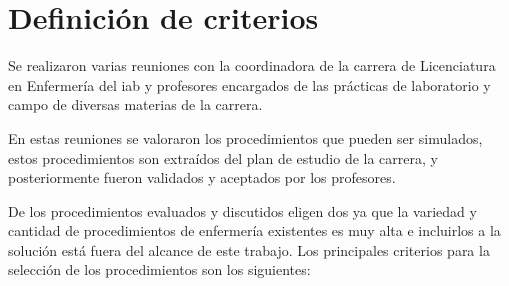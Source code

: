 \section{Definición de criterios}
\label{sec:criterios}

Se realizaron varias reuniones con la coordinadora de la carrera de Licenciatura
en Enfermería del \Gls{iab} y profesores encargados de las prácticas de
laboratorio y campo de diversas materias de la carrera.

En estas reuniones se valoraron los procedimientos que pueden ser simulados,
estos procedimientos son extraídos del plan de estudio de la carrera, y 
posteriormente fueron validados y aceptados por los profesores.

De los procedimientos evaluados y discutidos eligen dos ya que la variedad y 
cantidad de procedimientos de enfermería existentes es muy alta e incluirlos 
a la solución está fuera del alcance de este trabajo. Los principales criterios 
para la selección de los procedimientos son los siguientes:

